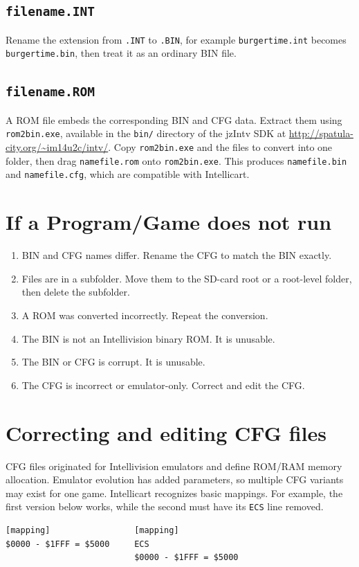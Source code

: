 \documentclass[a4paper,11pt]{article}
\newcommand{\file}[1]{\texttt{#1}}
\begin{document}
\subsection*{\file{filename.INT}}
Rename the extension from \file{.INT} to \file{.BIN}, for example \file{burgertime.int} becomes \file{burgertime.bin}, then treat it as an ordinary BIN file.

\subsection*{\file{filename.ROM}}
A ROM file embeds the corresponding BIN and CFG data. Extract them using \file{rom2bin.exe}, available in the \texttt{bin/} directory of the jzIntv SDK at \url{http://spatula-city.org/~im14u2c/intv/}. Copy \file{rom2bin.exe} and the files to convert into one folder, then drag \file{namefile.rom} onto \file{rom2bin.exe}. This produces \file{namefile.bin} and \file{namefile.cfg}, which are compatible with Intellicart.

\section*{If a Program/Game does not run}
\begin{enumerate}
  \item BIN and CFG names differ. Rename the CFG to match the BIN exactly.
  \item Files are in a subfolder. Move them to the SD-card root or a root-level folder, then delete the subfolder.
  \item A ROM was converted incorrectly. Repeat the conversion.
  \item The BIN is not an Intellivision binary ROM. It is unusable.
  \item The BIN or CFG is corrupt. It is unusable.
  \item The CFG is incorrect or emulator-only. Correct and edit the CFG.
\end{enumerate}

\section*{Correcting and editing CFG files}
CFG files originated for Intellivision emulators and define ROM/RAM memory allocation. Emulator evolution has added parameters, so multiple CFG variants may exist for one game. Intellicart recognizes basic mappings. For example, the first version below works, while the second must have its \texttt{ECS} line removed.
\begin{verbatim}
[mapping]                 [mapping]
$0000 - $1FFF = $5000     ECS
                          $0000 - $1FFF = $5000
\end{verbatim}
\end{document}
